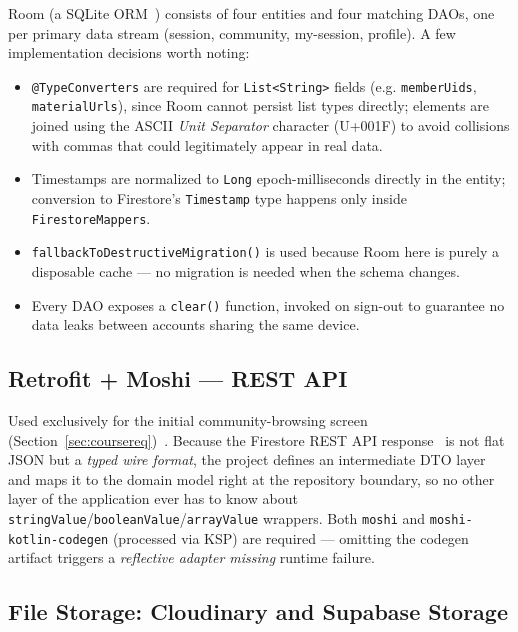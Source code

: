Room (a SQLite ORM~\cite{android-room}) consists of four entities and four matching DAOs, one per primary data stream (session, community, my-session, profile). A few implementation decisions worth noting:
\begin{itemize}
    \item \texttt{@TypeConverters} are required for \texttt{List<String>} fields (e.g. \texttt{memberUids}, \texttt{materialUrls}), since Room cannot persist list types directly; elements are joined using the ASCII \emph{Unit Separator} character (U+001F) to avoid collisions with commas that could legitimately appear in real data.
    \item Timestamps are normalized to \texttt{Long} epoch-milliseconds directly in the entity; conversion to Firestore's \texttt{Timestamp} type happens only inside \texttt{FirestoreMappers}.
    \item \texttt{fallbackToDestructiveMigration()} is used because Room here is purely a disposable cache — no migration is needed when the schema changes.
    \item Every DAO exposes a \texttt{clear()} function, invoked on sign-out to guarantee no data leaks between accounts sharing the same device.
\end{itemize}

\subsection{Retrofit + Moshi — REST API}

Used exclusively for the initial community-browsing screen (Section~\ref{sec:coursereq})~\cite{retrofit}. Because the Firestore REST API response~\cite{firestore-rest} is not flat JSON but a \emph{typed wire format}, the project defines an intermediate DTO layer and maps it to the domain model right at the repository boundary, so no other layer of the application ever has to know about \texttt{stringValue}/\texttt{booleanValue}/\texttt{arrayValue} wrappers. Both \texttt{moshi} and \texttt{moshi-kotlin-codegen} (processed via KSP) are required — omitting the codegen artifact triggers a \emph{reflective adapter missing} runtime failure.

\subsection{File Storage: Cloudinary and Supabase Storage}
\label{sec:filestorage}

